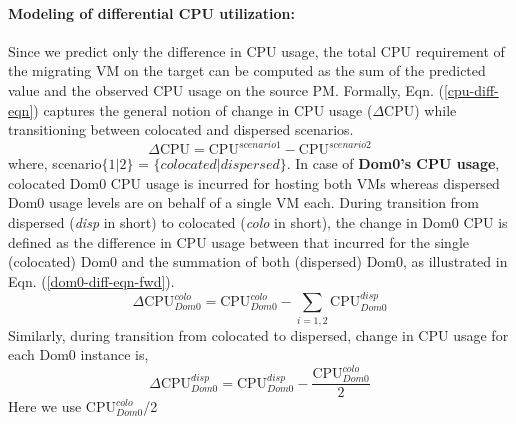 \paragraph{Modeling of differential CPU utilization: }
Since we predict only the difference in CPU usage, the total
CPU requirement of the migrating VM on the target can be computed
as the sum of the predicted value and the observed CPU usage on
the source PM. Formally, Eqn. (\ref{cpu-diff-eqn}) captures the
general notion of change in CPU usage ($\Delta\mbox{CPU}$)
while transitioning between colocated and dispersed scenarios.
\begin{equation}
	\Delta\mbox{CPU} = \mbox{CPU}^{scenario1} - \mbox{CPU}^{scenario2}
	\label{cpu-diff-eqn}
\end{equation}
where, scenario$\{1|2\}$ = $\{colocated|dispersed\}$.
In case of \textbf{Dom0's CPU usage}, colocated Dom0 CPU usage is incurred
for hosting both VMs whereas dispersed Dom0 usage levels are
on behalf of a single VM each. During transition from dispersed
(\textit{disp} in short) to colocated (\textit{colo} in short),
the change in Dom0 CPU is defined as the difference in CPU usage
between that incurred for the single (colocated) Dom0 and the
summation of both (dispersed) Dom0, as illustrated in
Eqn. (\ref{dom0-diff-eqn-fwd}).
\begin{equation}
	\Delta\mbox{CPU}^{colo}_{Dom0} = \mbox{CPU}^{colo}_{Dom0} - \displaystyle\sum\limits_{i=1,2}\mbox{CPU}^{disp}_{Dom0}
	\label{dom0-diff-eqn-fwd}
\end{equation}
Similarly, during transition from colocated to dispersed, change in
CPU usage for each Dom0 instance is,
\begin{equation}
	\Delta\mbox{CPU}^{disp}_{Dom0} = \mbox{CPU}^{disp}_{Dom0} - \frac{\mbox{CPU}^{colo}_{Dom0}}{2} %
	\label{dom0-diff-eqn-rev}
\end{equation}
Here we use %
$\mbox{CPU}^{colo}_{Dom0}$/2
